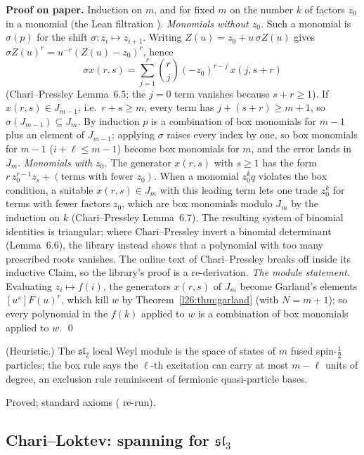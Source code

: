 \textbf{Proof on paper.} Induction on $m$, and for fixed $m$ on the number $k$ of factors $z_0$ in a monomial (the Lean
filtration ). \emph{Monomials without $z_0$.} Such a monomial is $\sigma(p)$ for the shift
$\sigma:z_i\mapsto z_{i+1}$. Writing $Z(u)=z_0+u\,\sigma Z(u)$ gives $\sigma Z(u)^r=u^{-r}(Z(u)-z_0)^r$, hence
\begin{equation*}
\sigma x(r,s)=\sum_{j=1}^{r}\binom rj(-z_0)^{r-j}\,x(j,s+r)
\end{equation*}
(Chari--Pressley Lemma~6.5; the $j=0$ term vanishes because $s+r\ge1$). If $x(r,s)\in J_{m-1}$, i.e.\ $r+s\ge m$, every term has
$j+(s+r)\ge m+1$, so $\sigma(J_{m-1})\subseteq J_m$. By induction $p$ is a combination of box monomials for $m-1$ plus an element of
$J_{m-1}$; applying $\sigma$ raises every index by one, so box monomials for $m-1$ ($i+\ell\le m-1$) become box monomials for
$m$, and the error lands in $J_m$. \emph{Monomials with $z_0$.} The generator $x(r,s)$ with $s\ge1$ has the form
$r\,z_0^{r-1}z_s+(\text{terms with fewer }z_0)$. When a monomial $z_0^kq$ violates the box condition, a suitable $x(r,s)\in J_m$ with
this leading term lets one trade $z_0^{k}$ for terms with fewer factors $z_0$, which are box monomials modulo $J_m$ by the induction
on $k$ (Chari--Pressley Lemma~6.7). The resulting system of binomial identities is triangular; where Chari--Pressley invert a
binomial determinant (Lemma~6.6), the library instead shows that a polynomial with too many prescribed roots vanishes. The online
text of Chari--Pressley breaks off inside its inductive Claim, so the library's proof is a re-derivation. \emph{The module
statement.} Evaluating $z_i\mapsto f(i)$, the generators $x(r,s)$ of $J_m$ become Garland's elements $[u^s]F(u)^r$, which kill $w$
by Theorem~\ref{l26:thm:garland} (with $N=m+1$); so every polynomial in the $f(k)$ applied to $w$ is a combination of box monomials
applied to $w$. \qed

\begin{physics}
(Heuristic.) The $\mathfrak{sl}_2$ local Weyl module is the space of states of $m$ fused spin-$\frac12$ particles; the box rule says
the $\ell$-th excitation can carry at most $m-\ell$ units of degree, an exclusion rule reminiscent of fermionic quasi-particle bases.
\end{physics}

\begin{status}
Proved; standard axioms ( re-run).
\end{status}

\subsection{Chari--Loktev: spanning for $\mathfrak{sl}_3$}

